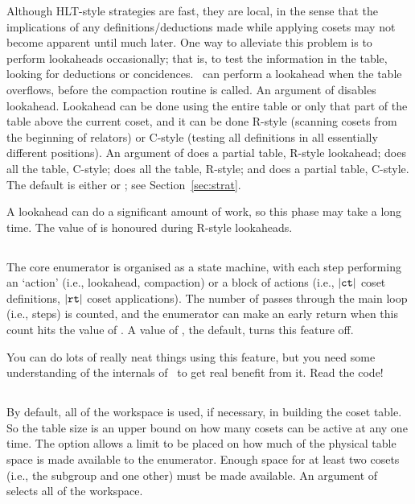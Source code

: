 Although HLT-style strategies are fast, they are local, in the sense that
  the implications of any definitions/deductions made while applying cosets
  may not become apparent until much later.
One way to alleviate this problem is to perform lookaheads occasionally;
  that is, to test the information in the table, looking for deductions
  or concidences.
\ace\ can perform a lookahead when the table overflows, before the
  compaction routine is called.
An argument of  disables lookahead.
Lookahead can be done using the entire table or only that part of the table
  above the current coset, and it can be done R-style (scanning cosets
  from the beginning of relators) or C-style (testing all definitions in
  all essentially different positions).
An argument of  does a partial table, R-style lookahead; 
  does all the table, C-style;  does all the table, R-style; and 
   does a partial table, C-style.
The default is either  or ; see Section~\ref{sec:strat}.

A lookahead can do a significant amount of work, so this phase may take a
  long time.
The value of  is honoured during R-style lookaheads.

\subsection{}

The core enumerator is organised as a state machine, with each step
  performing an `action' (i.e., lookahead, compaction) or a block of
  actions (i.e., $|\texttt{ct}|$ coset definitions, $|\texttt{rt}|$ coset
  applications).
The number of passes through the main loop (i.e., steps) is counted, and
  the enumerator can make an early return when this count hits the
  value of .
A value of , the default, turns this feature off.

You can do lots of really neat things using this feature, but you need
  some understanding of the internals of \ace\ to get real benefit from
  it.
Read the code!

\subsection{}

By default, all of the workspace is used, if necessary, in building the
  coset table.
So the table size is an upper bound on how many cosets can be active at
  any one time.
The  option allows a limit to be placed on how much of the
  physical table space is made available to the enumerator.
Enough space for at least two cosets (i.e., the subgroup and one other)
  must be made available.
An argument of  selects all of the workspace.

